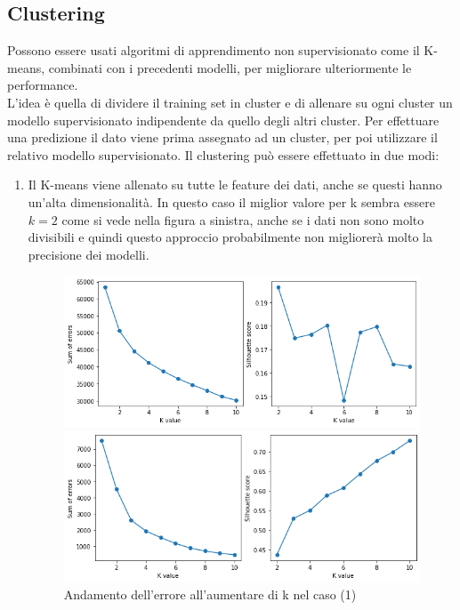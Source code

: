 \documentclass{article}
\begin{document}
\subsection{Clustering}
\label{sec:clustering}
Possono essere usati algoritmi di apprendimento non supervisionato come il
K-means, combinati con i precedenti modelli, per migliorare ulteriormente le
performance.\\
L'idea è quella di dividere il training set in cluster e di allenare su ogni
cluster un modello supervisionato indipendente da quello degli altri cluster.
Per effettuare una predizione il dato viene prima assegnato ad un cluster, per
poi utilizzare il relativo modello supervisionato.
Il clustering può essere effettuato in due modi:
\begin{enumerate}
	\item Il K-means viene allenato su tutte le feature dei dati, anche se
		questi hanno un'alta dimensionalità. In questo caso il miglior valore
		per k sembra essere $k=2$ come si vede nella figura a sinistra,
		anche se i dati non sono molto divisibili e quindi questo approccio
		probabilmente non migliorerà molto la precisione dei modelli.
		\begin{figure}[ht]
			\centering
			\begin{minipage}{0.48\textwidth}
				\centering
				\includegraphics[width=\textwidth]{kselection1.png}
				\caption{Andamento dell'errore all'aumentare di k nel caso (1)}
			\end{minipage}
			\hfill
			\begin{minipage}{0.48\textwidth}
				\centering
				\includegraphics[width=\textwidth]{kselection2.png}

\end{minipage}
\end{figure}
\end{enumerate}
\end{document}
